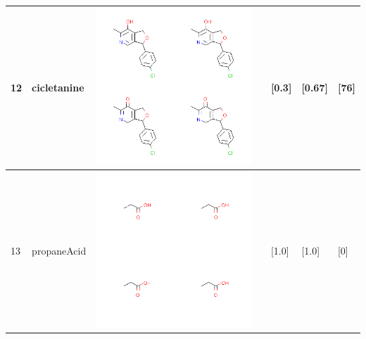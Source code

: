 \begin{longtable}{|l|l|l|l|l|l|l|}
12 & cicletanine & \includegraphics[scale=0.6]{cicletanineCA.png} & & [0.3]& [0.67] & [76] \\
\hline
13 & propaneAcid & \includegraphics[scale=0.6]{propaneAcidCA.png} & & [1.0]& [1.0] & [0] \\
\hline

\end{longtable}
